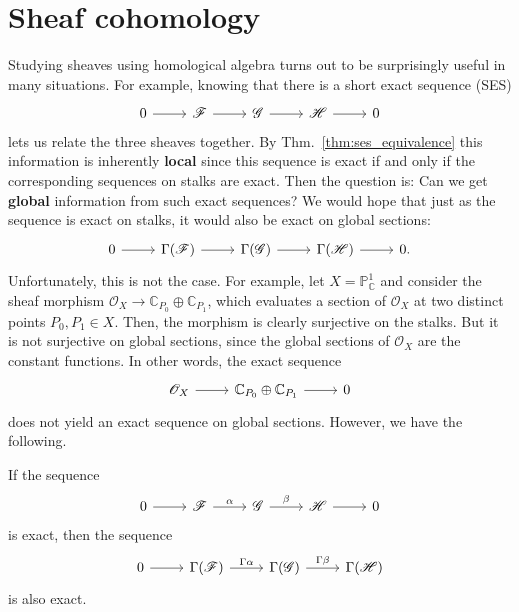 \section{Sheaf cohomology}
Studying sheaves using homological algebra turns out to be surprisingly
useful in many situations. For example, knowing that there is a
short exact sequence (SES)
\[
  \begin{tikzcd}
    0 \rar & \mathscr{F} \rar & \mathscr{G} \rar &
    \mathscr{H} \rar & 0
  \end{tikzcd}
\]
lets us relate the three sheaves together. By Thm.~\ref{thm:ses_equivalence}
this information is inherently \textbf{local} since this sequence is exact
if and only if the corresponding sequences on stalks are exact.
Then the question is: Can we get \textbf{global} information from
such exact sequences? We would hope that just as the sequence is exact
on stalks, it would also be exact on global sections:
\[
\begin{tikzcd}
  0 \rar & \Gamma(\mathscr{F}) \rar & \Gamma(\mathscr{G})
  \rar & \Gamma(\mathscr{H}) \rar & 0.
\end{tikzcd}
\]
Unfortunately, this is not the case. For example, let
$X=\mathbb{P}^{1}_{\mathbb{C}}$ and consider the sheaf morphism
$\mathscr{O}_{X}\to\mathbb{C}_{P_{0}}\oplus\mathbb{C}_{P_{1}}$,
which evaluates a section of $\mathscr{O}_{X}$ at two distinct points
$P_{0},P_{1}\in X$. Then, the morphism is clearly surjective on the stalks.
But it is not surjective on global sections, since the global sections of
$\mathscr{O}_{X}$ are the constant functions. In other words, the exact
sequence
\[\begin{tikzcd}
    \mathscr{O}_{X}\rar & \mathbb{C}_{P_{0}}\oplus\mathbb{C}_{P_{1}}\rar & 0
  \end{tikzcd}\]
does not yield an exact sequence on global sections. However, we have the
following.
\begin{prop}
  If the sequence
  \[
  \begin{tikzcd}
    0\rar & \mathscr{F}\rar{\alpha} & \mathscr{G}\rar{\beta}
    & \mathscr{H}\rar & 0
  \end{tikzcd}
  \]
  is exact, then the sequence
  \[
  \begin{tikzcd}
    0\rar & \Gamma(\mathscr{F})\rar{\Gamma\alpha}
    & \Gamma(\mathscr{G})\rar{\Gamma\beta}
    & \Gamma(\mathscr{H})
  \end{tikzcd}
  \]
  is also exact.
\end{prop}
